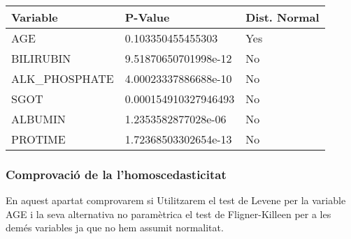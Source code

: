 \documentclass[]{article}
\newenvironment{Shaded}{\begin{snugshade}}{\end{snugshade}}
\newcommand{\ControlFlowTok}[1]{\textcolor[rgb]{0.13,0.29,0.53}{\textbf{#1}}}
\newcommand{\FloatTok}[1]{\textcolor[rgb]{0.00,0.00,0.81}{#1}}
\newcommand{\KeywordTok}[1]{\textcolor[rgb]{0.13,0.29,0.53}{\textbf{#1}}}
\newcommand{\NormalTok}[1]{#1}
\newcommand{\OperatorTok}[1]{\textcolor[rgb]{0.81,0.36,0.00}{\textbf{#1}}}
\newcommand{\OtherTok}[1]{\textcolor[rgb]{0.56,0.35,0.01}{#1}}
\newcommand{\StringTok}[1]{\textcolor[rgb]{0.31,0.60,0.02}{#1}}
\begin{document}
\begin{Shaded}
\end{Shaded}

\begin{table}[H]
\centering
\begin{tabular}{l|l|l}
\hline
Variable & P-Value & Dist. Normal\\
\hline
AGE & 0.103350455455303 & Yes\\
\hline
BILIRUBIN & 9.51870650701998e-12 & No\\
\hline
ALK\_PHOSPHATE & 4.00023337886688e-10 & No\\
\hline
SGOT & 0.000154910327946493 & No\\
\hline
ALBUMIN & 1.2353582877028e-06 & No\\
\hline
PROTIME & 1.72368503302654e-13 & No\\
\hline
\end{tabular}
\end{table}

\hypertarget{comprovaciuxf3-de-la-lhomoscedasticitat}{%
\subsubsection{Comprovació de la
l'homoscedasticitat}\label{comprovaciuxf3-de-la-lhomoscedasticitat}}

En aquest apartat comprovarem si Utilitzarem el test de Levene per la
variable AGE i la seva alternativa no paramètrica el test de
Fligner-Killeen per a les demés variables ja que no hem assumit
normalitat.
\end{document}
